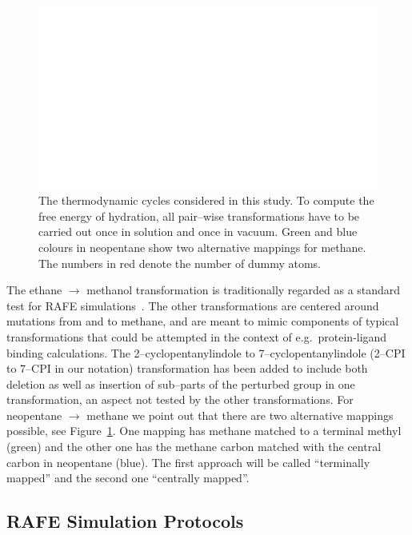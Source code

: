 \documentclass[journal=jctcce,manuscript=article]{achemso}
\begin{document}
\begin{figure}[ht]
  \includegraphics[scale=1.0]{figures/cycles.pdf}
  \caption{The thermodynamic cycles considered in this study.  To
    compute the free energy of hydration, all pair--wise
    transformations have to be carried out once in solution and once
    in vacuum.  Green and blue colours in neopentane show two
    alternative mappings for methane.  The numbers in red denote the
    number of dummy atoms.}
  \label{fig:cycles}
\end{figure}

The ethane $\rightarrow$ methanol transformation is traditionally
regarded as a standard test for RAFE
simulations~\cite{doi:10.1063/1.449208, doi:10.1021/jp981629f}.   The
other transformations are centered around mutations from and to
methane, and are meant to mimic components of typical transformations that could be attempted
in the context of e.g.\ protein-ligand binding calculations. The 
2--cyclopentanylindole to 7--cyclopentanylindole (2--CPI to 7--CPI in our notation)
transformation has been added to include both deletion as well as
insertion of sub--parts of the perturbed group in one transformation, an aspect not tested by the other transformations.  For
neopentane $\rightarrow$ methane we point out that there are two
alternative mappings possible, see Figure~\ref{fig:cycles}.  One mapping has methane matched to a terminal methyl (green) and the other
one has the methane carbon matched with the central carbon in
neopentane (blue).  The first approach will be called ``terminally mapped'' and 
the second one ``centrally mapped''.


\subsection{RAFE Simulation Protocols}
\label{sec:rafe_protocols}
\end{document}
